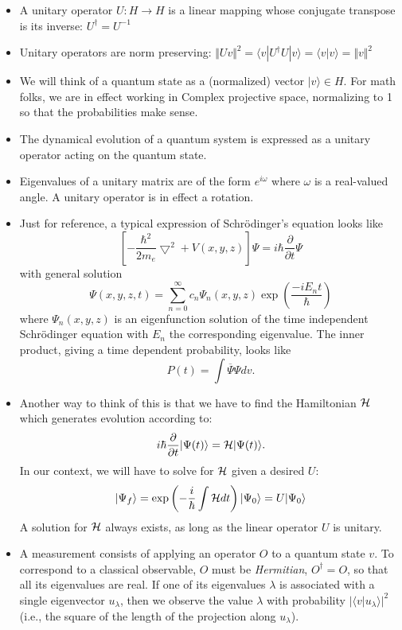 \documentclass{article}
\def\pagedone{\newpage}
\def\ket#1{|{#1}\rangle}
\def\bra#1{\langle{#1}|}
\def\braket#1#2{\langle{#1}|{#2}\rangle}
\def\hilbert{\mathit{H}}
\begin{document}
\pagedone
	\begin{itemize}		
	\item A unitary operator $ U : \hilbert \to \hilbert $ is a linear mapping
		whose conjugate transpose is its inverse:  $ U^\dag = U^{-1} $
	\item Unitary operators are norm preserving: \newline
		$ \Vert Uv \Vert ^2 = \bra v U^\dag U \ket v = \braket v v = \Vert v \Vert ^2 $
	\item We will think of a quantum state as a (normalized) vector $ \ket v \in \hilbert $.
		For math folks, we are in effect working in Complex projective space, normalizing
		to 1 so that the probabilities make sense.
	\item The dynamical evolution of a quantum system is expressed as a unitary operator acting on
		the quantum state.

	\item Eigenvalues of a unitary matrix are of the form $ e ^ {i\omega} $ where $\omega$ is a
		real-valued angle.  A unitary operator is in effect a rotation.
\pagedone
	\item Just for reference, a typical expression of Schr\"odinger's equation looks like
		$$\left[-\frac{\hbar^2}{2m_e}\bigtriangledown^2+V(x,y,z)\right]\Psi =
				i\hbar\frac{\partial}{\partial t}
		\Psi$$
		with general solution
		$$\Psi(x,y,z,t)=\sum_{n=0}^\infty c_n\Psi_n(x,y,z)\exp\left(\frac{-iE_nt}{\hbar}\right)$$
		where $\Psi_n(x,y,z)$ is an eigenfunction solution of the time independent Schr\"odinger
		equation with $E_n$ the corresponding eigenvalue.  The inner product, giving a time 
		dependent probability, looks like
		$$P(t) = \int\overline\Psi\Psi dv.$$
		\item Another way to think of this is that we have to find the Hamiltonian ${\cal H}$
 which generates evolution according to:
         $$i\hbar\frac{\partial}{\partial t}\ket{\Psi(t)}={\cal H }\ket{\Psi(t)}.$$
In our context, we will have to solve for ${\cal H}$ given a desired $U$:
$$
\ket{\Psi_f}=\exp\left(-\frac{i}{\hbar}\int{\cal{H}}dt\right)\ket{\Psi_0}=
 U\ket{\Psi_0}
$$
A solution for 	 ${\cal H}$ always exists,
 as long as the linear operator $U$ is unitary.
 
	\item A measurement consists of applying an operator $O$ to a quantum state $v$.  To
		correspond to a classical observable, $O$ must be {\em Hermitian}, $O^\dag = O$, so
		that all its eigenvalues are real.  If one of its eigenvalues $\lambda$ is associated with
		a single eigenvector $u_\lambda$, then we observe the value $\lambda$ with probability
		$\vert \braket v {u_\lambda} \vert ^ 2$ (i.e., the square of the length of
		the projection along $u_\lambda$).
\end{itemize}
	
\end{document}
